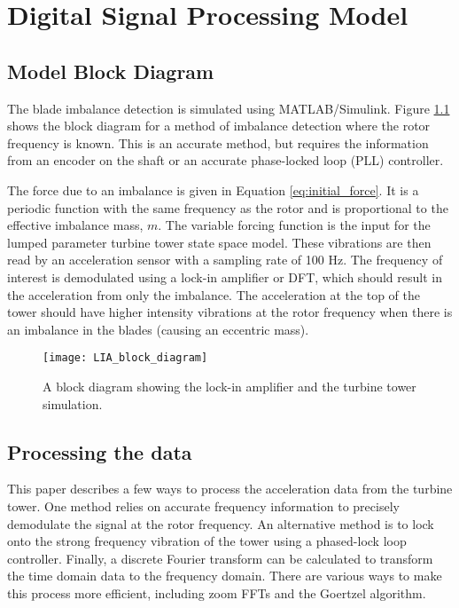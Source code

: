 \chapter{Digital Signal Processing Model} %

\label{ch_dsp_model} 

\section{Model Block Diagram}
The blade imbalance detection is simulated using MATLAB/Simulink.  Figure \ref{fig:LIA_block_diagram} shows the block diagram for a method of imbalance detection where the rotor frequency is known.  This is an accurate method, but requires the information from an encoder on the shaft or an accurate phase-locked loop (PLL) controller.  

The force due to an imbalance is given in Equation \ref{eq:initial_force}.  It is a periodic function with the same frequency as the rotor and is proportional to the effective imbalance mass, $m$.  The variable forcing function is the input for the lumped parameter turbine tower state space model. These vibrations are then read by an acceleration sensor with a sampling rate of 100 Hz.  The frequency of interest is demodulated using a lock-in amplifier or DFT, which should result in the acceleration from only the imbalance.  The acceleration at the top of the tower should have higher intensity vibrations at the rotor frequency when there is an imbalance in the blades (causing an eccentric mass).

\begin{figure}
	\centering
	\texttt{[image: LIA\_block\_diagram]}
	\decoRule
	\caption{A block diagram showing the lock-in amplifier and the turbine tower simulation.}
	\label{fig:LIA_block_diagram}
\end{figure}


\section{Processing the data}

This paper describes a few ways to process the acceleration data from the turbine tower.  One method relies on accurate frequency information to precisely demodulate the signal at the rotor frequency.  An alternative method is to lock onto the strong frequency vibration of the tower using a phased-lock loop controller.  Finally, a discrete Fourier transform can be calculated to transform the time domain data to the frequency domain.  There are various ways to make this process more efficient, including zoom FFTs and the Goertzel algorithm.

